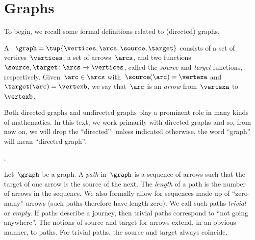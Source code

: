 
\section{Graphs}

To begin, we recall some formal definitions related to (directed) graphs.

\begin{definition}[Graph]
    \label{def:Graph}
    A \emph{}~$\graph=\tup{\vertices,\arcs, \source,\target}$ consists of a set of vertices~$\vertices$, a set of arrows~$\arcs$, and two functions~$\source,\target \colon \arcs \to \vertices$, called the \emph{source} and \emph{target} functions, respectively.
    Given~$\arc\in \arcs$ with~$\source(\arc)=\vertexa$ and~$\target(\arc)=\vertexb$, we say that~$\arc$ is an \emph{arrow} from~$\vertexa$ to~$\vertexb$.
\end{definition}

\begin{remark}
    Both directed graphs and undirected graphs play a prominent role in many kinds of mathematics.
    In this text, we work primarily with directed graphs and so, from now on, we will drop the ``directed'': unless indicated otherwise, the word ``graph'' will mean ``directed graph''.
\end{remark}
.
\begin{definition}[Path]
    \label{def:path}
    Let~$\graph$ be a graph.
    A \emph{path} in~$\graph$ is a sequence of arrows such that the target of one arrow is the source of the next.
    The \emph{length} of a path is the number of arrows in the sequence.
    We also formally allow for sequences made up of ``zero-many'' arrows (such paths therefore have length zero).
    We call such paths \emph{trivial} or \emph{empty}.
    If paths describe a journey, then trivial paths correspond to ``not going anywhere''.
    The notions of source and target for arrows extend, in an obvious manner, to paths.
    For trivial paths, the source and target always coincide.
\end{definition}
